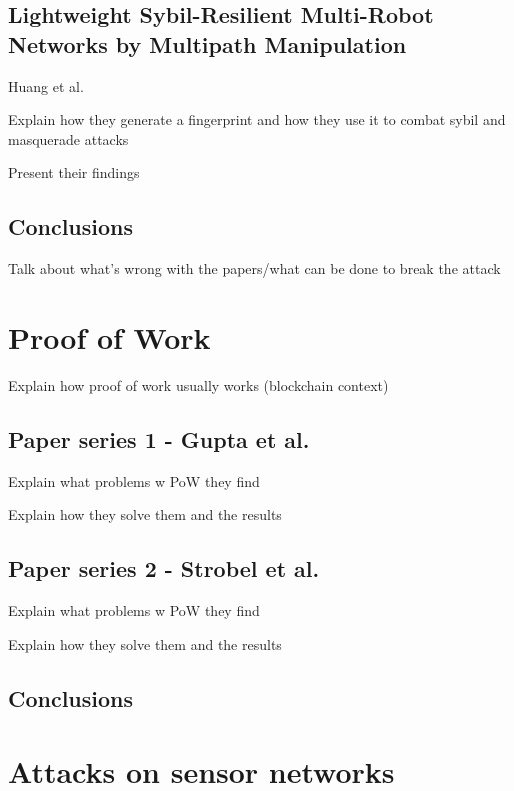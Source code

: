 \subsection{Lightweight Sybil-Resilient Multi-Robot Networks by Multipath Manipulation}
Huang et al.

Explain how they generate a fingerprint and how they use it to combat sybil and masquerade attacks

Present their findings

\subsection{Conclusions}

Talk about what's wrong with the papers/what can be done to break the attack

\section{Proof of Work}
Explain how proof of work usually works (blockchain context)

\subsection{Paper series 1 - Gupta et al.}
Explain what problems w PoW they find

Explain how they solve them and the results

\subsection{Paper series 2 - Strobel et al.}

Explain what problems w PoW they find

Explain how they solve them and the results

\subsection{Conclusions}

\section{Attacks on sensor networks}

